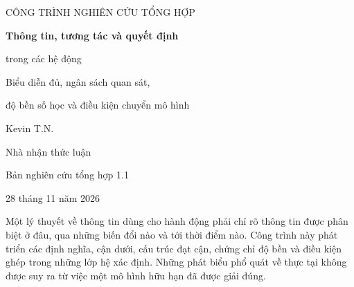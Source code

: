 
\begin{titlepage}
\centering
\vspace*{18mm}
{\Large CÔNG TRÌNH NGHIÊN CỨU TỔNG HỢP\par}
\vspace{12mm}
{\huge\bfseries Thông tin, tương tác và quyết định\par trong các hệ động\par}
\vspace{7mm}
{\Large Biểu diễn đủ, ngân sách quan sát,\par độ bền số học và điều kiện chuyển mô hình\par}
\vspace{15mm}
{\Large Kevin T.N.\par}
{\large Nhà nhận thức luận\par}
\vspace{12mm}
{\large Bản nghiên cứu tổng hợp 1.1\par 28 tháng 11 năm 2026\par}
\vfill
\begin{minipage}{0.88\textwidth}
Một lý thuyết về thông tin dùng cho hành động phải chỉ rõ thông tin được phân biệt ở đâu, qua những biến đổi nào và tới thời điểm nào. Công trình này phát triển các định nghĩa, cận dưới, cấu trúc đạt cận, chứng chỉ độ bền và điều kiện ghép trong những lớp hệ xác định. Những phát biểu phổ quát về thực tại không được suy ra từ việc một mô hình hữu hạn đã được giải đúng.
\end{minipage}
\vspace{12mm}
\end{titlepage}
